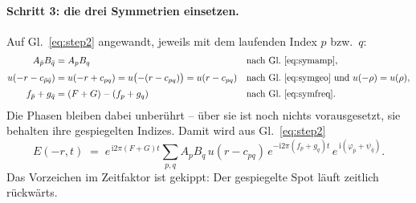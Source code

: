 \documentclass[11pt,a4paper]{article}
\begin{document}
\paragraph{Schritt 3: die drei Symmetrien einsetzen.}
Auf Gl.~\eqref{eq:step2} angewandt, jeweils mit dem laufenden Index $p$
bzw.\ $q$:
\begin{align}
  A_{\bar p} B_{\bar q} &= A_p B_q
  && \text{nach Gl.~\eqref{eq:symamp},}\\[2pt]
  u(-r-c_{\bar p\bar q}) &= u(-r+c_{pq}) = u\bigl(-(r-c_{pq})\bigr) = u(r-c_{pq})
  && \text{nach Gl.~\eqref{eq:symgeo} und } u(-\rho)=u(\rho),\\[2pt]
  f_{\bar p}+g_{\bar q} &= (F+G) - (f_p+g_q)
  && \text{nach Gl.~\eqref{eq:symfreq}.}
\end{align}
Die Phasen bleiben dabei unberührt -- über sie ist noch nichts vorausgesetzt,
sie behalten ihre gespiegelten Indizes. Damit wird aus Gl.~\eqref{eq:step2}
\begin{equation}
  E(-r,t) \;=\; e^{\,\mathrm{i}2\pi (F+G) t}
  \sum_{p,q} A_p B_q\, u(r-c_{pq})\,
  e^{-\mathrm{i}2\pi (f_p+g_q)t}\,
  e^{\,\mathrm{i}\left(\varphi_{\bar p}+\psi_{\bar q}\right)} .
  \label{eq:step3}
\end{equation}
Das Vorzeichen im Zeitfaktor ist gekippt: Der gespiegelte Spot läuft zeitlich
rückwärts.
\end{document}
